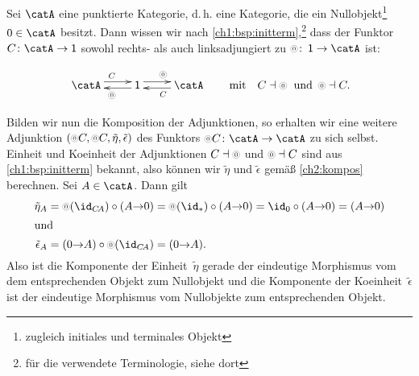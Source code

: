 \begin{thBeispiel}[Nullobjekte]
    \newcommand{\cO}{\circledchar[black!40]{$0$}}
    Sei $\catA$ eine punktierte Kategorie, d.\,h. eine Kategorie, die ein
    Nullobjekt\footnote{zugleich initiales und terminales Objekt}~$0\in\catA$ 
    besitzt. Dann wissen wir nach \cref{ch1:bsp:initterm},\footnote{für die
    verwendete Terminologie, siehe dort} dass der Funktor $C\colon\catA\to\One$ 
    sowohl rechts- als auch linksadjungiert zu $\cO\colon\One\to\catA$ ist:

    \[ 
        \xymatrix{ \catA \ar@<3.5pt>[r]^C & \ar@<2pt>[l]^{\cO} \One
        \ar@<3.5pt>[r]^{\cO} & \ar@<2pt>[l]^C \catA
        }
        \qquad\text{mit}\quad 
        C\leftadjoint\cO \text{\; und \,} \cO\leftadjoint C
    . \]

    \noindent
    Bilden wir nun die Komposition der Adjunktionen, so erhalten wir eine
    weitere Adjunktion $(\cO C, \cO C, \tilde\eta, \tilde\epsilon)$ des Funktors
    $\cO C\colon\catA\to\catA$ zu sich selbst. Einheit und Koeinheit der
    Adjunktionen $C\leftadjoint\cO$ und $\cO\leftadjoint C$ sind aus
    \cref{ch1:bsp:initterm} bekannt, also können wir $\tilde\eta$ und
    $\tilde\epsilon$ gemäß \cref{ch2:kompos} berechnen. Sei $A\in\catA$. 
    Dann gilt
    \begin{align*}
        \tilde\eta_A &= \cO(\id_{C\!A}) \after (A{\to}0)
        = \cO(\id_\ast) \after (A{\to}0) = \id_0 \after (A{\to}0) = (A{\to}0)
        \\
        \shortintertext{und}
        \tilde\epsilon_A &= (0{\to}A) \after \cO(\id_{C\!A}) = (0{\to}A)
    . \end{align*}
    Also ist die Komponente der Einheit~$\tilde\eta$ gerade der eindeutige
    Morphismus vom dem entsprechenden Objekt zum Nullobjekt und die Komponente
    der Koeinheit~$\tilde\epsilon$ ist der eindeutige Morphismus vom Nullobjekte
    zum entsprechenden Objekt.
\end{thBeispiel}
